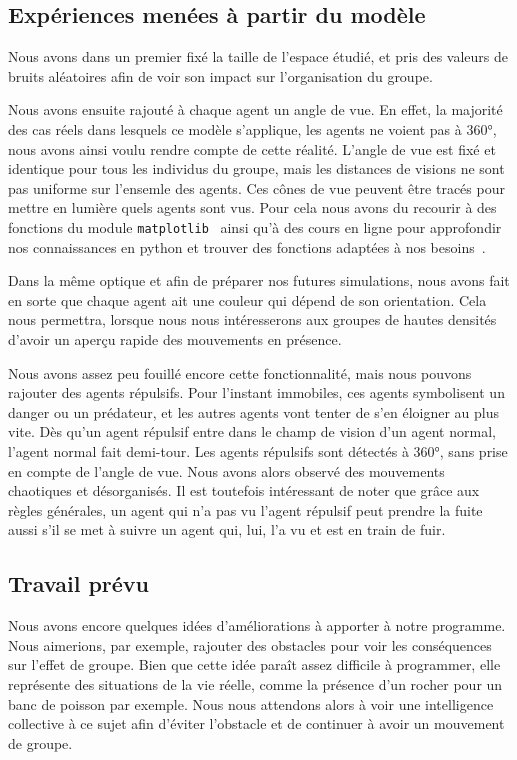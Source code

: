 \documentclass[french, a4paper, 12pt]{article}
\begin{document}
	\subsection{Expériences menées à partir du modèle}
	Nous avons dans un premier fixé la taille de l'espace étudié, et pris des valeurs de bruits aléatoires afin de voir son impact sur l'organisation du groupe.

	Nous avons ensuite rajouté à chaque agent un angle de vue. En effet, la majorité des cas réels dans lesquels ce modèle s'applique, les agents ne voient pas à 360°, nous avons ainsi voulu rendre compte de cette réalité. L'angle de vue est fixé et identique pour tous les individus du groupe, mais les distances de visions ne sont pas uniforme sur l'ensemle des agents. Ces cônes de vue peuvent être tracés pour mettre en lumière quels agents sont vus. Pour cela nous avons du recourir à des fonctions du module \verb|matplotlib|~\cite{matplotlib} ainsi qu'à des cours en ligne pour approfondir nos connaissances en python et trouver des fonctions adaptées à nos besoins~\cite{python}.

	Dans la même optique et afin de préparer nos futures simulations, nous avons fait en sorte que chaque agent ait une couleur qui dépend de son orientation. Cela nous permettra, lorsque nous nous intéresserons aux groupes de hautes densités d'avoir un aperçu rapide des mouvements en présence.
    
	Nous avons assez peu fouillé encore cette fonctionnalité, mais nous pouvons rajouter des agents répulsifs. Pour l'instant immobiles, ces agents symbolisent un danger ou un prédateur, et les autres agents vont tenter de s'en éloigner au plus vite. Dès qu'un agent répulsif entre dans le champ de vision d'un agent normal, l'agent normal fait demi-tour. Les agents répulsifs sont détectés à 360°, sans prise en compte de l'angle de vue. Nous avons alors observé des mouvements chaotiques et désorganisés. Il est toutefois intéressant de noter que grâce aux règles générales, un agent qui n'a pas vu l'agent répulsif peut prendre la fuite aussi s'il se met à suivre un agent qui, lui, l'a vu et est en train de fuir.

	\subsection{Travail prévu}
	Nous avons encore quelques idées d'améliorations à apporter à notre programme. Nous aimerions, par exemple, rajouter des obstacles pour voir les conséquences sur l'effet de groupe. Bien que cette idée paraît assez difficile à programmer, elle représente des situations de la vie réelle, comme la présence d'un rocher pour un banc de poisson par exemple. Nous nous attendons alors à voir une intelligence collective à ce sujet afin d'éviter l'obstacle et de continuer à avoir un mouvement de groupe.
	
\end{document}
